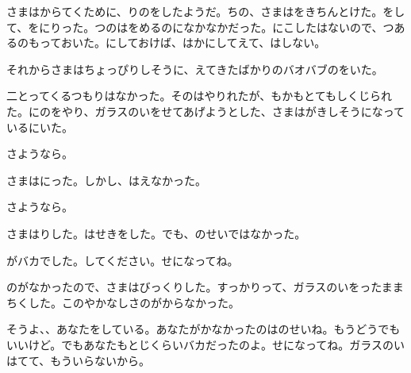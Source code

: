 さまはからてくために、りのをしたようだ。ちの、さまはをきちんとけた。をして、をにりった。つのはをめるのになかなかだった。にこしたはないので、つあるのもっておいた。にしておけば、はかにしてえて、はしない。

それからさまはちょっぴりしそうに、えてきたばかりのバオバブのをいた。

二とってくるつもりはなかった。そのはやりれたが、もかもとてもしくじられた。にのをやり、ガラスのいをせてあげようとした、さまはがきしそうになっているにいた。

さようなら。

さまはにった。しかし、はえなかった。

さようなら。

さまはりした。はせきをした。でも、のせいではなかった。

がバカでした。してください。せになってね。

のがなかったので、さまはびっくりした。すっかりって、ガラスのいをったままちくした。このやかなしさのがからなかった。

そうよ、、あなたをしている。あなたがかなかったのはのせいね。もうどうでもいいけど。でもあなたもとじくらいバカだったのよ。せになってね。ガラスのいはてて、もういらないから。

